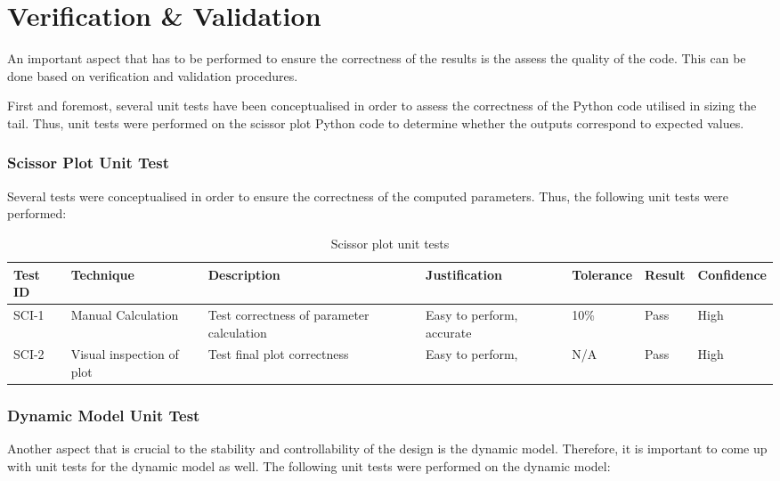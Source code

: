 \section{Verification \& Validation}
\label{sec:Stability_and_Control_V&V}
An important aspect that has to be performed to ensure the correctness of the results is the assess the quality of the code.
This can be done based on verification and validation procedures.

First and foremost, several unit tests have been conceptualised in order to assess the correctness of the Python code utilised in sizing the tail.
Thus, unit tests were performed on the scissor plot Python code to determine whether the outputs correspond to expected values.

\subsubsection{Scissor Plot Unit Test}
Several tests were conceptualised in order to ensure the correctness of the computed parameters.
Thus, the following unit tests were performed:
\begin{table}[H]
\centering
\caption{Scissor plot unit tests}
\begin{tabular}{p{1.5cm} p{2.2cm} p{2.5cm} p{2cm} p{2cm} p{2cm} p{1.5cm}}
\hline
Test ID & Technique                                                           & Description                                                                         & Justification                                                      & Tolerance & Result & Confidence \\ \hline
SCI-1   & Manual Calculation  & Test correctness of parameter calculation & Easy to perform, accurate & 10\%       & Pass   & High       \\
SCI-2   & Visual inspection of plot & Test final plot correctness                                                         & Easy to perform, & N/A       & Pass   & High      
\end{tabular}
\end{table}

\subsubsection{Dynamic Model Unit Test}
Another aspect that is crucial to the stability and controllability of the design is the dynamic model.
Therefore, it is important to come up with unit tests for the dynamic model as well.
The following unit tests were performed on the dynamic model:

